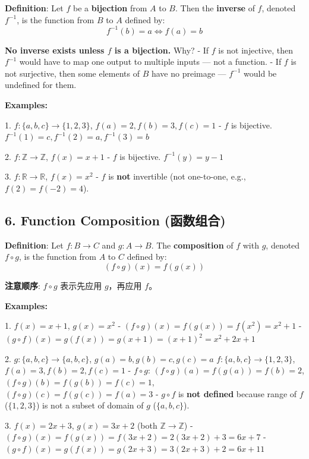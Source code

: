 \documentclass[10pt,a4paper,openany]{ctexbook}
\theoremstyle{definition}
\theoremstyle{remark}
\renewenvironment{quote}
  {\list{}{\leftmargin=1em\rightmargin=0pt\topsep=0.5pt\partopsep=0pt}\item[]}
  {\endlist}
\begin{document}
\textbf{Definition}: Let $f$ be a \textbf{bijection} from $A$ to $B$. Then the \textbf{inverse} of $f$, denoted $f^{-1}$, is the function from $B$ to $A$ defined by:
\[
f^{-1}(b) = a \iff f(a) = b
\]

\begin{quote}
\textbf{No inverse exists unless $f$ is a bijection.} Why?
- If $f$ is not injective, then $f^{-1}$ would have to map one output to multiple inputs — not a function.
- If $f$ is not surjective, then some elements of $B$ have no preimage — $f^{-1}$ would be undefined for them.

\textbf{Examples:}

1. $f: \{a,b,c\} \to \{1,2,3\}$, $f(a)=2, f(b)=3, f(c)=1$
- $f$ is bijective. $f^{-1}(1)=c, f^{-1}(2)=a, f^{-1}(3)=b$

2. $f: \mathbb{Z} \to \mathbb{Z}$, $f(x) = x + 1$
- $f$ is bijective. $f^{-1}(y) = y - 1$

3. $f: \mathbb{R} \to \mathbb{R}$, $f(x) = x^2$
- $f$ is \textbf{not} invertible (not one-to-one, e.g., $f(2)=f(-2)=4$).

\end{quote}
\vspace{-2pt}

\subsection{6. Function Composition (函数组合)}

\textbf{Definition}: Let $f: B \to C$ and $g: A \to B$. The \textbf{composition} of $f$ with $g$, denoted $f \circ g$, is the function from $A$ to $C$ defined by:
\[
(f \circ g)(x) = f(g(x))
\]

\begin{quote}
\textbf{注意顺序}: $f \circ g$ 表示先应用 $g$，再应用 $f$。

\textbf{Examples:}

1. $f(x) = x + 1$, $g(x) = x^2$
- $(f \circ g)(x) = f(g(x)) = f(x^2) = x^2 + 1$
- $(g \circ f)(x) = g(f(x)) = g(x+1) = (x+1)^2 = x^2 + 2x + 1$

2. $g: \{a,b,c\} \to \{a,b,c\}$, $g(a)=b, g(b)=c, g(c)=a$
$f: \{a,b,c\} \to \{1,2,3\}$, $f(a)=3, f(b)=2, f(c)=1$
- $f \circ g$: $(f \circ g)(a) = f(g(a)) = f(b) = 2$, $(f \circ g)(b) = f(g(b)) = f(c) = 1$, $(f \circ g)(c) = f(g(c)) = f(a) = 3$
- $g \circ f$ is \textbf{not defined} because range of $f$ ($\{1,2,3\}$) is not a subset of domain of $g$ ($\{a,b,c\}$).

3. $f(x) = 2x + 3$, $g(x) = 3x + 2$ (both $\mathbb{Z} \to \mathbb{Z}$)
- $(f \circ g)(x) = f(g(x)) = f(3x+2) = 2(3x+2) + 3 = 6x + 7$
- $(g \circ f)(x) = g(f(x)) = g(2x+3) = 3(2x+3) + 2 = 6x + 11$

\end{quote}
\vspace{-2pt}
\end{document}
